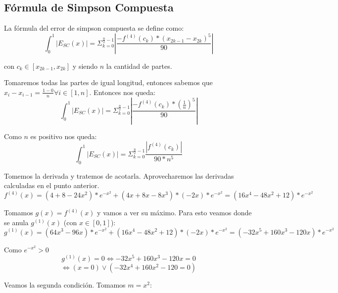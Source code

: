 \documentclass[a4paper,10pt]{article}
\begin{document}
\subsection{Fórmula de Simpson Compuesta}
\par La fórmula del error de simpson compuesta se define como:
\begin{equation}
	\int_0^1 \left| E_{SC}(x) \right|  = \Sigma_{k=0}^{\frac{n}{2}-1} \left| \frac{-f^{(4)}(c_k)*(x_{2k-1} - x_{2k})^5}{90}  \right|
\end{equation}
\par con $c_k \in [x_{2k-1}, x_{2k}]$ y siendo $n$ la cantidad de partes.
\par Tomaremos todas las partes de igual longitud, entonces sabemos que $x_i - x_{i-1} = \frac{1-0}{n} \forall i \in [1,n]$. Entonces nos queda:
\begin{equation}
	\int_0^1 \left| E_{SC}(x) \right| = \Sigma_{k=0}^{\frac{n}{2}-1} \left| \frac{-f^{(4)}(c_k)*(\frac{1}{n})^5}{90} \right|
\end{equation}
\par Como $n$ es positivo nos queda:
\begin{equation}
	\int_0^1 \left| E_{SC}(x) \right| = \Sigma_{k=0}^{\frac{n}{2}-1} \frac{\left|f^{(4)}(c_k)\right|}{90*n^5}
\end{equation}
\par Tomemos la derivada y tratemos de acotarla. Aprovecharemos las derivadas calculadas en el punto anterior.
\begin{equation}
	f^{(4)}(x) = (4 + 8 - 24x^2)*e^{-x^2} + (4x + 8x -8x^3)*(-2x)*e^{-x^2} = (16x^4 - 48x^2 + 12)*e^{-x^2}
\end{equation}
\par Tomamos $g(x) = f^{(4)}(x)$ y vamos a ver su máximo. Para esto veamos donde se anula $g^{(1)}(x)$ (con $x \in [0,1]$):
\begin{equation}
	g^{(1)}(x) = (64x^3 - 96x)*e^{-x^2} + (16x^4 - 48x^2 + 12)*(-2x)*e^{-x^2} = (-32x^5 + 160x^3 - 120x)*e^{-x^2}
\end{equation}
\par Como $e^{-x^2} > 0$
\begin{equation}
	g^{(1)}(x) = 0 \Leftrightarrow -32x^5 + 160x^3 - 120x = 0
\end{equation}
\begin{equation}
	\Leftrightarrow (x=0) \vee (-32x^4 + 160x^2 - 120 = 0)
\end{equation}
\par Veamos la segunda condición. Tomamos $m=x^2$:
\end{document}
